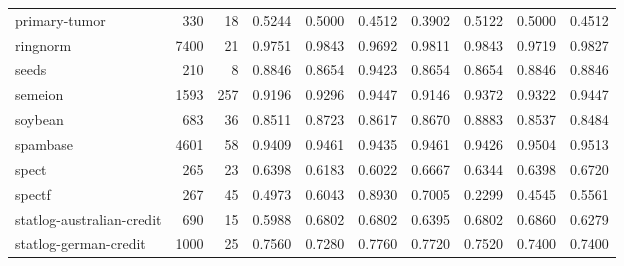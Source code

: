 \documentclass{article}
\begin{document}
\begin{table}
\begin{tabular}{lrrlllllll}
primary-tumor & 330 & 18 & 0.5244 & 0.5000 & 0.4512 & 0.3902 & 0.5122 & 0.5000 & 0.4512\tabularnewline
ringnorm & 7400 & 21 & 0.9751 & 0.9843 & 0.9692 & 0.9811 & 0.9843 & 0.9719 & 0.9827\tabularnewline
seeds & 210 & 8 & 0.8846 & 0.8654 & 0.9423 & 0.8654 & 0.8654 & 0.8846 & 0.8846\tabularnewline
semeion & 1593 & 257 & 0.9196 & 0.9296 & 0.9447 & 0.9146 & 0.9372 & 0.9322 & 0.9447\tabularnewline
soybean & 683 & 36 & 0.8511 & 0.8723 & 0.8617 & 0.8670 & 0.8883 & 0.8537 & 0.8484\tabularnewline
spambase & 4601 & 58 & 0.9409 & 0.9461 & 0.9435 & 0.9461 & 0.9426 & 0.9504 & 0.9513\tabularnewline
spect & 265 & 23 & 0.6398 & 0.6183 & 0.6022 & 0.6667 & 0.6344 & 0.6398 & 0.6720\tabularnewline
spectf & 267 & 45 & 0.4973 & 0.6043 & 0.8930 & 0.7005 & 0.2299 & 0.4545 & 0.5561\tabularnewline
statlog-australian-credit & 690 & 15 & 0.5988 & 0.6802 & 0.6802 & 0.6395 & 0.6802 & 0.6860 & 0.6279\tabularnewline
statlog-german-credit & 1000 & 25 & 0.7560 & 0.7280 & 0.7760 & 0.7720 & 0.7520 & 0.7400 & 0.7400\tabularnewline
\end{tabular}
\end{table}
\end{document}
